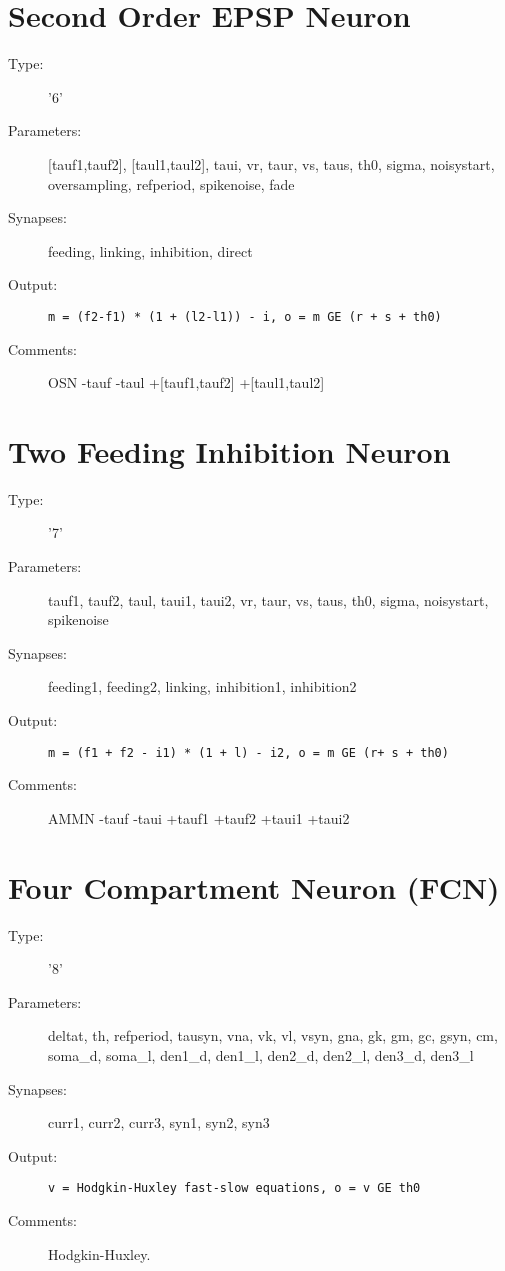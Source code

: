 \documentclass[12pt]{article}
\begin{document}
\section{Second Order EPSP Neuron}
\begin{description}
\item[Type:] '6'

\item[Parameters:] [tauf1,tauf2], [taul1,taul2], taui, vr, taur, vs, taus, th0, 
              sigma, noisystart, oversampling, refperiod, spikenoise, fade 

\item[Synapses:] feeding, linking, inhibition, direct

\item[Output:] \texttt{m = (f2-f1) * (1 + (l2-l1)) - i, o = m GE (r + s + th0)}

\item[Comments:] OSN -tauf -taul +[tauf1,tauf2] +[taul1,taul2]
\end{description}



\section{Two Feeding Inhibition Neuron}
\begin{description}
\item[Type:] '7'

\item[Parameters:] tauf1, tauf2, taul, taui1, taui2, vr, taur, vs, taus, th0, 
              sigma, noisystart, spikenoise

\item[Synapses:] feeding1, feeding2, linking, inhibition1, inhibition2

\item[Output:] \texttt{m = (f1 + f2 - i1) * (1 + l) - i2, o = m GE (r+ s + th0)}

\item[Comments:] AMMN -tauf -taui +tauf1 +tauf2 +taui1 +taui2
\end{description}



\section{Four Compartment Neuron (FCN)}
\begin{description}
\item[Type:] '8'

\item[Parameters:] deltat, th, refperiod, tausyn, vna, vk, vl, vsyn, gna, gk, gm, 
                gc, gsyn, cm, soma\_d, soma\_l, den1\_d, den1\_l, den2\_d, den2\_l,
                den3\_d, den3\_l

\item[Synapses:] curr1, curr2, curr3, syn1, syn2, syn3

\item[Output:] \texttt{v = Hodgkin-Huxley fast-slow equations, o = v GE th0}

\item[Comments:] Hodgkin-Huxley.
\end{description}
\end{document}
